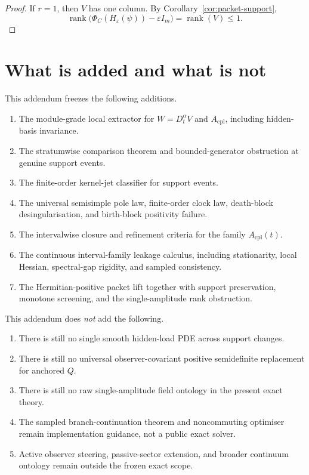 \documentclass[11pt,a4paper]{article}
\numberwithin{equation}{section}
\DeclareMathOperator{\rank}{rank}
\theoremstyle{thmcompact}
\theoremstyle{remark}
\begin{document}
\begin{proof}
If $r=1$, then $V$ has one column. By Corollary~\ref{cor:packet-support},
\[
\rank\bigl(\Phi_C(H_\varepsilon(\psi))-\varepsilon I_m\bigr)=\rank(V)\le 1.
\]
\end{proof}

\section{What is added and what is not}

This addendum freezes the following additions.

\begin{enumerate}
\item The module-grade local extractor for $W=D_t^\alpha V$ and $A_{\mathrm{cpl}}$, including hidden-basis invariance.
\item The stratumwise comparison theorem and bounded-generator obstruction at genuine support events.
\item The finite-order kernel-jet classifier for support events.
\item The universal semisimple pole law, finite-order clock law, death-block desingularisation, and birth-block positivity failure.
\item The intervalwise closure and refinement criteria for the family $A_{\mathrm{cpl}}(t)$.
\item The continuous interval-family leakage calculus, including stationarity, local Hessian, spectral-gap rigidity, and sampled consistency.
\item The Hermitian-positive packet lift together with support preservation, monotone screening, and the single-amplitude rank obstruction.
\end{enumerate}

This addendum does \emph{not} add the following.

\begin{enumerate}
\item There is still no single smooth hidden-load PDE across support changes.
\item There is still no universal observer-covariant positive semidefinite replacement for anchored $Q$.
\item There is still no raw single-amplitude field ontology in the present exact theory.
\item The sampled branch-continuation theorem and noncommuting optimiser remain implementation guidance, not a public exact solver.
\item Active observer steering, passive-sector extension, and broader continuum ontology remain outside the frozen exact scope.
\end{enumerate}
\end{document}

